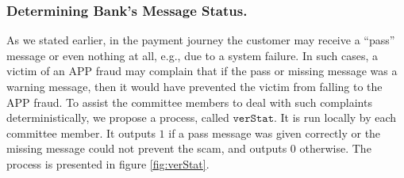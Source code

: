 

\subsubsection{Determining Bank's Message Status.}

  As we stated earlier, in the payment journey the customer may receive a ``pass'' message or even nothing at all, e.g., due to a system failure. In such cases,  a victim of  an APP fraud may complain that if the pass or missing message was   a warning message, then it   would have prevented the victim from falling to the APP fraud. To assist the committee members to deal with  such complaints deterministically, we propose a process,  called $\mathtt{verStat}$. It is run locally by each committee member. It outputs $1$ if a pass message was given correctly or the missing message could not  prevent the scam, and outputs $0$ otherwise. The process is presented in figure \ref{fig:verStat}.


